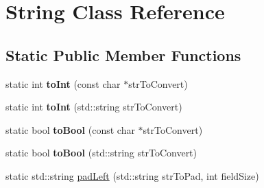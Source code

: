 \hypertarget{classString}{
\section{\-String \-Class \-Reference}
\label{d3/dee/classString}
}
\subsection*{\-Static \-Public \-Member \-Functions}
\begin{DoxyCompactItemize}
\item 
\hypertarget{classString_a36cf94cf05d8a38200440ee47bb36230}{
static int {\bfseries to\-Int} (const char $\ast$str\-To\-Convert)}
\label{d3/dee/classString_a36cf94cf05d8a38200440ee47bb36230}

\item 
\hypertarget{classString_a7b3742204bde23b66ab9f3f14376d729}{
static int {\bfseries to\-Int} (std\-::string str\-To\-Convert)}
\label{d3/dee/classString_a7b3742204bde23b66ab9f3f14376d729}

\item 
\hypertarget{classString_a0613bdae452b95755890c6db97ef63cf}{
static bool {\bfseries to\-Bool} (const char $\ast$str\-To\-Convert)}
\label{d3/dee/classString_a0613bdae452b95755890c6db97ef63cf}

\item 
\hypertarget{classString_a24ad14b55ef382e1e070592461099f48}{
static bool {\bfseries to\-Bool} (std\-::string str\-To\-Convert)}
\label{d3/dee/classString_a24ad14b55ef382e1e070592461099f48}

\item 
static std\-::string \hyperlink{classString_abf4e2526abbf391636a4eae820d091c7}{pad\-Left} (std\-::string str\-To\-Pad, int field\-Size)
\end{DoxyCompactItemize}



